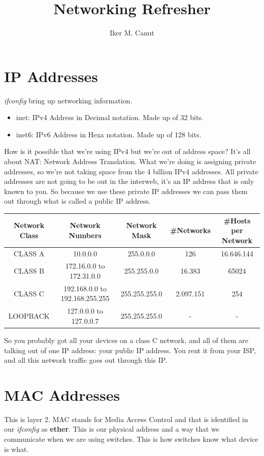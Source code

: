 \documentclass[11pt,a4paper]{article}
\author{Iker M. Canut}
\title{Networking Refresher}
\begin{document}
\maketitle
\newpage

\section{IP Addresses}
\textit{ifconfig} bring up networking information.
\begin{itemize}
\item inet: IPv4 Address in Decimal notation. Made up of 32 bits.
\item inet6: IPv6 Address in Hexa notation. Made up of 128 bits.
\end{itemize}
How is it possible that we're using IPv4 but we're out of address space? It's all about NAT: Network Address Translation. What we're doing is assigning private addresses, so we're not taking space from the 4 billion IPv4 addresses. All private addresses are not going to be out in the interweb, it's an IP address that is only known to you. So because we use these private IP addresses we can pass them out through what is called a public IP address.

\begin{table}[h]
\centering
\begin{tabular}{|c|c|c|c|c|}
\hline
Network Class & Network Numbers & Network Mask & \#Networks & \#Hosts per Network\\
\hline
CLASS A & 10.0.0.0 & 255.0.0.0 & 126 & 16.646.144\\
\hline
CLASS B & 172.16.0.0 to 172.31.0.0 & 255.255.0.0 & 16.383 & 65024\\
\hline
CLASS C & 192.168.0.0 to 192.168.255.255 & 255.255.255.0 & 2.097.151 & 254\\
\hline
LOOPBACK & 127.0.0.0 to 127.0.0.7 & 255.255.255.0 & - & -\\
\hline
\end{tabular}
\end{table}
So you probably got all your devices on a class C network, and all of them are talking out of one IP address: your public IP address. You rent it from your ISP, and all this network traffic goes out through this IP.

\section{MAC Addresses}
This is layer 2. MAC stands for Media Access Control and that is identified in our \textit{ifconfig} as \textbf{ether}. This is our physical address and a way that we communicate when we are using switches. This is how switches know what device is what.\\
\end{document}
